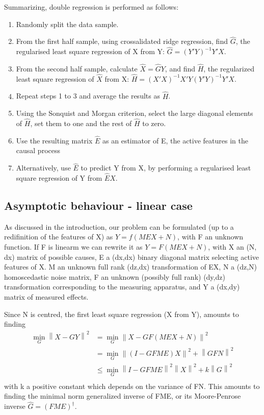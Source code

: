 \documentclass{article}
\begin{document}
Summarizing, double regression is performed as follows:
\begin{enumerate}
\item Randomly split the data sample.
\item From the first half sample, using crossalidated ridge regression, find $\hat G$, the regularised least square regression of X from Y: $\hat G=(Y'Y)^{-1} Y'X$.
\item From the second half sample, calculate $\hat X = \hat G Y$, and find $\hat H$, the regularized least square regression of $\hat X$ from X: $\hat H=(X'X)^{-1} X'Y(Y'Y)^{-1} Y'X$.
\item Repeat steps 1 to 3 and average the results as $\hat H$.
\item Using the Sonquist and Morgan criterion, select the large diagonal elements of $\hat H$, set them to one and the rest of $\hat  H$ to zero.
\item Use the resulting matrix $\hat E$ as an estimator of E, the active features in the causal process
\item Alternatively, use $\hat E$ to predict Y from X, by performing a regularised least square regression of Y from $\hat E X$.
%

\end{enumerate}

\subsection{Asymptotic behaviour - linear case}
As discussed in the introduction, our problem can be formulated (up to a redifinition of the features of X) as $Y=f(MEX+N)$, with F an unknown function.
%
If F is linearm we can rewrite it as $Y = F(MEX + N)$, with X an (N, dx) matrix of possible causes, E a (dx,dx) binary diagonal matrix selecting active features of X.
%
M an unknown full rank (dz,dx) transformation of EX, N a (dz,N) homoscedastic noise matrix, F an unknown (possibly full rank) (dy,dz) transformation corresponding to the measuring apparatus, and Y a (dx,dy) matrix of measured effects.

Since N is centred, the first least square regression (X from Y), amounts to finding
\begin{equation}
\begin{aligned}
\min_G \left \| X-GY \right \|^2 &= \min_G \left \| X - GF(MEX+N)\right\|^2 \\
&{}= \min_G \left \| (I-GFME)X\right\| ^2 + \left \| GFN\right \| ^2\\
&{}\leq \min_G \left \| I-GFME\right\| ^2 \left \| X\right\| ^2 + k\left \| G\right \| ^2\\
\end{aligned}
\end{equation}
with k a positive constant which depends on the variance of FN.
%
This amounts to finding the minimal norm generalized inverse of FME, or its Moore-Penrose inverse $\hat  G= (FME)^{\dagger}$.
\end{document}
